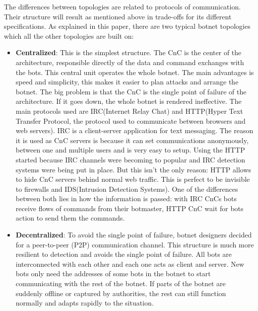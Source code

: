 The differences between topologies are related to protocols of communication. Their structure will result as mentioned above in trade-offs for its different specifications.
\cite{survey6}
\cite{bot-intro}
As explained in this paper, there are two typical botnet topologies which all the other topologies are built on:
\begin{itemize}[noitemsep]
\item \textbf{Centralized}: This is the simplest structure. The CnC is the center of the architecture, responsible directly of the data and command exchanges with the bots. This central unit operates the whole botnet. The main advantages is speed and simplicity, this makes it easier to plan attacks and arrange the botnet. The big problem is that the CnC is the single point of failure of the architecture. If it goes down, the whole botnet is rendered ineffective. The main protocols used are IRC(Internet Relay Chat) and HTTP(Hyper Text Transfer Protocol, the protocol used to communicate between browsers and web servers). IRC is a client-server application for text messaging. The reason it is used as CnC servers is because it can set communications anonymously, between one and multiple users and is very easy to setup. Using the HTTP started because IRC channels were becoming to popular and IRC detection systems were being put in place. But this isn't the only reason: HTTP allows to hide CnC servers behind normal web traffic. This is perfect to be invisible to firewalls and IDS(Intrusion Detection Systems). One of the differences between both lies in how the information is passed: with IRC CnCs bots receive flows of commands from their botmaster, HTTP CnC wait for bots action to send them the commands.\cite{bot-com}
\item \textbf{Decentralized}: To avoid the single point of failure, botnet designers decided for a peer-to-peer (P2P) communication channel. This structure is much more resilient to detection and avoids the single point of failure. All bots are interconnected with each other and each one acts as client and server. New bots only need the addresses of some bots in the botnet to start communicating with the rest of the botnet. If parts of the botnet are suddenly offline or captured by authorities, the rest can still function normally and adapts rapidly to the situation.\cite{ict-11}
\end{itemize}
